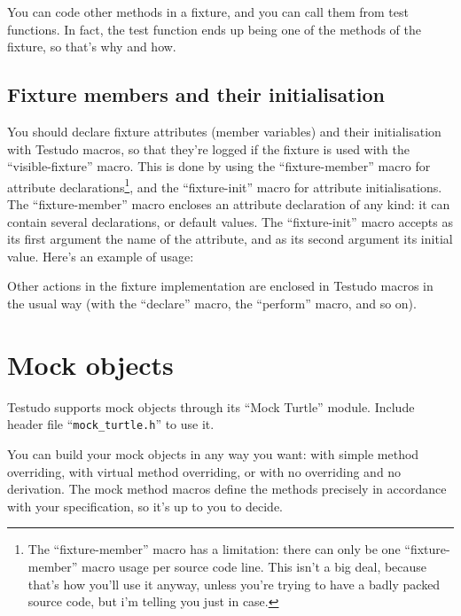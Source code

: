 \documentclass[twoside, a4paper, article]{memoir}
\providecommand\typesetexample[1]{%
}
\begin{document}
You can code other methods in a fixture, and you can call them from test
functions.  In fact, the test function ends up being one of the methods of the
fixture, so that's why and how.

\section{Fixture members and their initialisation}
\label{sec:fixture-members-and-initialisation}

You should declare fixture attributes (member variables) and their
initialisation with Testudo macros, so that they're logged if the fixture is
used with the ``visible-fixture'' macro.  This is done by using the
``fixture-member'' macro for attribute declarations\footnote{The
  ``fixture-member'' macro has a limitation: there can only be one
  ``fixture-member'' macro usage per source code line.  This isn't a big deal,
  because that's how you'll use it anyway, unless you're trying to have a badly
  packed source code, but i'm telling you just in case.}, and the
``fixture-init'' macro for attribute initialisations.  The ``fixture-member''
macro encloses an attribute declaration of any kind: it can contain several
declarations, or default values.  The ``fixture-init'' macro accepts as its
first argument the name of the attribute, and as its second argument its
initial value.  Here's an example of usage:

\typesetexample{fixture-members}

Other actions in the fixture implementation are enclosed in Testudo macros in
the usual way (with the ``declare'' macro, the ``perform'' macro, and so on).


\chapter{Mock objects}
\label{cha:mock-objects}

Testudo supports mock objects through its ``Mock Turtle'' module.  Include
header file ``\texttt{mock\_turtle.h}'' to use it.

\typesetexample{include-mock-turtle}

You can build your mock objects in any way you want: with simple method
overriding, with virtual method overriding, or with no overriding and no
derivation.  The mock method macros define the methods precisely in accordance
with your specification, so it's up to you to decide.
\end{document}
